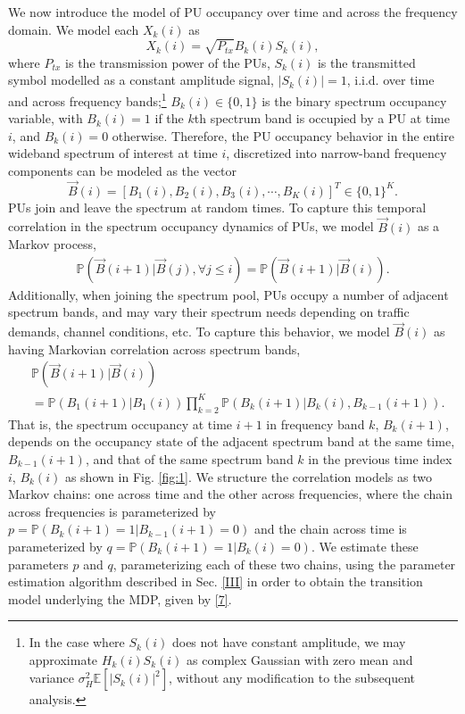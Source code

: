 \documentclass[10pt,twocolumn]{IEEEtran}
\begin{document}
We now introduce the model of PU occupancy over time and across the frequency domain. We model each $X_k(i)$ as 
\begin{equation}\label{4}
    X_k(i) = \sqrt{P_{tx}}B_k(i)S_k(i),
\end{equation}
where $P_{tx}$ is the transmission power of the PUs, $S_k(i)$ is the transmitted symbol modelled as a constant amplitude signal, $|S_k(i)|{=}1$, i.i.d. over time and across frequency bands;\footnote{In the case where $S_k(i)$ does not have constant amplitude, we may approximate $H_{k}(i)S_{k}(i)$ as complex Gaussian with zero mean and variance $\sigma_H^2\mathbb E[|S_{k}(i)|^2]$, without any modification to the subsequent analysis.} $B_k(i){\in}\{0,1\}$ is the binary spectrum occupancy variable, with $B_k(i){=}1$ if the $k$th spectrum band is occupied by a PU at time $i$, and $B_k(i){=}0$ otherwise. Therefore, the PU occupancy behavior in the entire wideband spectrum of interest at time $i$, discretized into narrow-band frequency components can be modeled as the vector 
\begin{equation}\label{5}
    \vec{B}(i) = [B_1(i), B_2(i), B_3(i), \cdots, B_K(i)]^T {\in} \{0, 1\}^K.
\end{equation}
PUs join and leave the spectrum at random times. To capture this temporal correlation in the spectrum occupancy dynamics of PUs, we model $\vec{B}(i)$ as a Markov process,
\begin{equation}\label{6}
    \begin{aligned}
        \mathbb{P}(\vec{B}(i+1)|\vec{B}(j), \forall j \leq i) = \mathbb{P}(\vec{B}(i+1)|\vec{B}(i)).
    \end{aligned}
\end{equation}
Additionally, when joining the spectrum pool, PUs occupy a number of adjacent spectrum bands, and may vary their spectrum needs depending on traffic demands, channel conditions, etc. To capture this behavior, we model $\vec{B}(i)$ as having Markovian correlation across spectrum bands,
\begin{align}\label{7}
&         \mathbb{P}(\vec{B}(i+1)|\vec{B}(i))\\&=
\nonumber
         \mathbb{P}(B_{1}(i+1)|B_{1}(i))
         \prod_{k=2}^{K} \mathbb{P}(B_{k}(i+1)|B_{k}(i), B_{k-1}(i+1)).
\end{align}
That is, the spectrum occupancy at time $i+1$ in frequency band $k$, $B_{k}(i+1)$, depends on the  occupancy state of the adjacent spectrum band at the same time, $B_{k-1}(i+1)$, and that of the same spectrum band $k$ in the previous time index $i$, $B_{k}(i)$ as shown in Fig. \ref{fig:1}. We structure the correlation models as two Markov chains: one across time and the other across frequencies, where the chain across frequencies is parameterized by $p{=}\mathbb{P}(B_{k}(i+1){=}1|B_{k-1}(i+1){=}0)$ and the chain across time is parameterized by $q{=}\mathbb{P}(B_{k}(i+1){=}1|B_{k}(i){=}0)$. We estimate these parameters $p$ and $q$, parameterizing each of these two chains, using the parameter estimation algorithm described in Sec. \ref{III} in order to obtain the transition model underlying the MDP, given by \eqref{7}.
\end{document}
